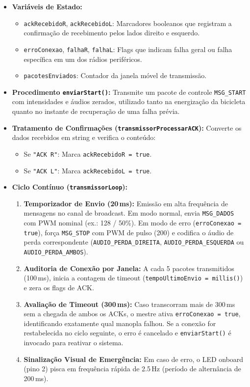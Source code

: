 \documentclass[12pt,a4paper]{article}
\begin{document}
\begin{itemize}
    \item \textbf{Variáveis de Estado:}
    \begin{itemize}
        \item \texttt{ackRecebidoR}, \texttt{ackRecebidoL}: Marcadores booleanos que registram a confirmação de recebimento pelos lados direito e esquerdo.
        \item \texttt{erroConexao}, \texttt{falhaR}, \texttt{falhaL}: Flags que indicam falha geral ou falha específica em um dos rádios periféricos.
        \item \texttt{pacotesEnviados}: Contador da janela móvel de transmissão.
    \end{itemize}
    \item \textbf{Procedimento \texttt{enviarStart()}:} Transmite um pacote de controle \texttt{MSG\_START} com intensidades e áudios zerados, utilizado tanto na energização da bicicleta quanto no instante de recuperação de uma falha prévia.
    \item \textbf{Tratamento de Confirmações (\texttt{transmissorProcessarACK}):} Converte os dados recebidos em string e verifica o conteúdo:
    \begin{itemize}
        \item Se \texttt{"ACK R"}: Marca \texttt{ackRecebidoR = true}.
        \item Se \texttt{"ACK L"}: Marca \texttt{ackRecebidoL = true}.
    \end{itemize}
    \item \textbf{Ciclo Contínuo (\texttt{transmissorLoop}):}
    \begin{enumerate}
        \item \textbf{Temporizador de Envio (20\,ms):} Emissão em alta frequência de mensagens no canal de broadcast. Em modo normal, envia \texttt{MSG\_DADOS} com PWM nominal (ex.: 128 / 50\%). Em modo de erro (\texttt{erroConexao = true}), força \texttt{MSG\_STOP} com PWM de pulso (200) e codifica o áudio de perda correspondente (\texttt{AUDIO\_PERDA\_DIREITA}, \texttt{AUDIO\_PERDA\_ESQUERDA} ou \texttt{AUDIO\_PERDA\_AMBOS}).
        \item \textbf{Auditoria de Conexão por Janela:} A cada 5 pacotes transmitidos (100\,ms), inicia a contagem de timeout (\texttt{tempoUltimoEnvio = millis()}) e zera os flags de ACK.
        \item \textbf{Avaliação de Timeout (300\,ms):} Caso transcorram mais de 300\,ms sem a chegada de ambos os ACKs, o mestre ativa \texttt{erroConexao = true}, identificando exatamente qual manopla falhou. Se a conexão for restabelecida no ciclo seguinte, o erro é cancelado e \texttt{enviarStart()} é invocado para reativar o sistema.
        \item \textbf{Sinalização Visual de Emergência:} Em caso de erro, o LED onboard (pino 2) pisca em frequência rápida de 2.5\,Hz (período de alternância de 200\,ms).
    \end{enumerate}
\end{itemize}
\end{document}
